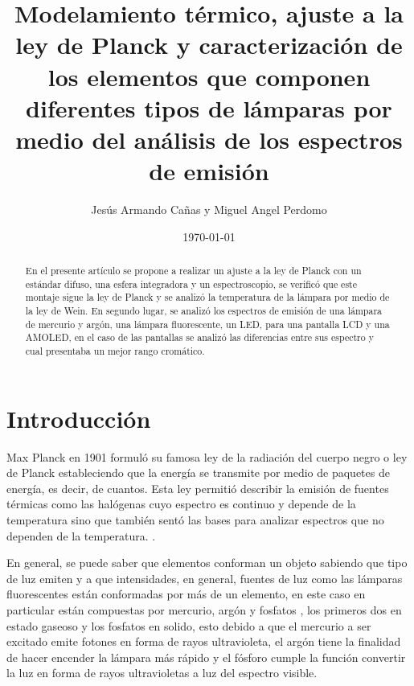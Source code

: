 \documentclass[twocolumn]{article}
\begin{document}
\title{Modelamiento térmico, ajuste a la ley de Planck y caracterización de los elementos que componen  diferentes tipos de lámparas por medio del análisis de los espectros de emisión}
\author{Jesús Armando Cañas y Miguel Angel Perdomo }
\date{\today}

\maketitle
\begin{abstract}
    En el presente artículo se propone a realizar un ajuste a la ley de Planck con un estándar difuso, una esfera integradora y un espectroscopio, se verificó que este montaje sigue la ley de Planck y se analizó la temperatura de la lámpara por medio de la ley de Wein. En segundo lugar, se analizó los espectros de emisión de una lámpara de mercurio y argón, una lámpara fluorescente, un LED, para una pantalla LCD y una AMOLED, en el caso de las pantallas se analizó las diferencias entre sus espectro y cual presentaba un mejor rango cromático.
\end{abstract}
\section{Introducción}
Max Planck en 1901 formuló su famosa ley de la radiación del cuerpo negro o ley de Planck estableciendo que la energía se transmite por medio de paquetes de energía, es decir, de cuantos. Esta ley permitió describir la emisión de fuentes térmicas como las halógenas cuyo espectro es continuo y depende de la temperatura  sino que también sentó las bases para analizar espectros que no dependen de la temperatura. \cite{Planck1901}.

En general, se puede saber que elementos conforman un objeto sabiendo que tipo de luz emiten y a que intensidades, en general, fuentes de luz como las lámparas fluorescentes están conformadas por más de un elemento, en este caso en particular están compuestas por mercurio, argón y fosfatos \cite{Lamptech2011}, los primeros dos en estado gaseoso y los fosfatos en solido, esto debido a que el mercurio a ser excitado emite fotones en forma de rayos ultravioleta, el argón tiene la finalidad de hacer encender la lámpara más rápido \cite{moon1936scientific} y el fósforo cumple la función convertir la luz en forma de rayos ultravioletas a luz del espectro visible.
\end{document}
